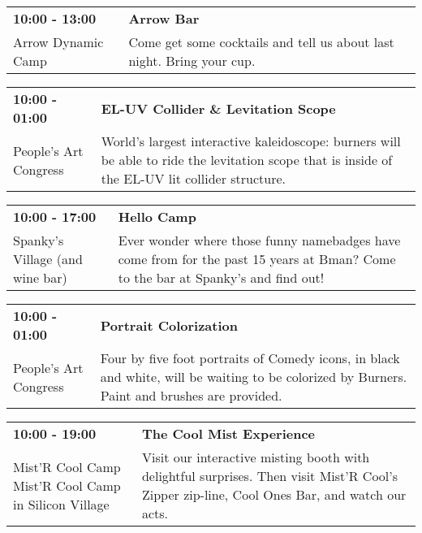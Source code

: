 \begin{tabular}{ p{1in} p{2.2in} }
    \textbf{10:00 - 13:00} & \textbf{Arrow Bar} \\
    Arrow Dynamic Camp \newline  & Come get some cocktails and tell us about last night. Bring your cup. \\
    \hline 
\end{tabular}
    
\begin{tabular}{ p{1in} p{2.2in} }
    \textbf{10:00 - 01:00} & \textbf{EL-UV Collider \& Levitation Scope} \\
    People's Art Congress \newline  & World's largest interactive kaleidoscope: burners will be able to ride the levitation scope that is inside of the EL-UV lit collider structure. \\
    \hline 
\end{tabular}
    
\begin{tabular}{ p{1in} p{2.2in} }
    \textbf{10:00 - 17:00} & \textbf{Hello Camp} \\
    Spanky's Village (and wine bar) \newline  & Ever wonder where those funny namebadges have come from for the past 15 years at Bman?  Come to the bar at Spanky's and find out! \\
    \hline 
\end{tabular}
    
\begin{tabular}{ p{1in} p{2.2in} }
    \textbf{10:00 - 01:00} & \textbf{Portrait Colorization} \\
    People's Art Congress \newline  & Four by five foot portraits of Comedy icons, in black and white, will be waiting to be colorized by Burners. Paint and brushes are provided. \\
    \hline 
\end{tabular}
    
\begin{tabular}{ p{1in} p{2.2in} }
    \textbf{10:00 - 19:00} & \textbf{The Cool Mist Experience} \\
    Mist'R Cool Camp \newline Mist'R Cool Camp in Silicon Village & Visit our interactive misting booth with delightful surprises. Then visit Mist'R Cool's Zipper zip-line, Cool Ones Bar, and watch our acts. \\
    \hline 
\end{tabular}
    
